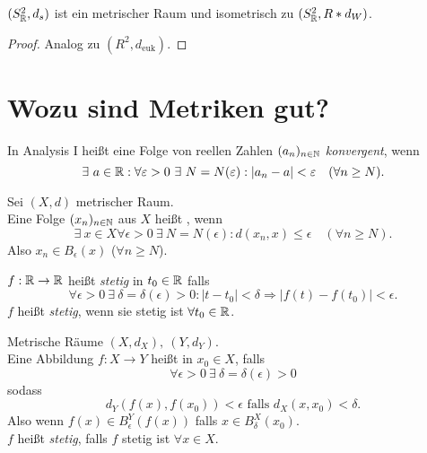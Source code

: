 \begin{theorem}
  $ (S^2_{\mathbb{R}}, d_s) $ ist ein metrischer Raum und isometrisch zu $ (S^2_{\mathbb{R}}, R*d_W) $.
  \begin{proof}
    Analog zu $ (R^2, d_\text{euk}) $.
  \end{proof}
\end{theorem}

\section{Wozu sind Metriken gut?}

\begin{remark}
  In Analysis I heißt eine Folge von reellen Zahlen $ (a_n)_{n \in \mathbb{N}} $ \emph{konvergent}, wenn
  \begin{equation*}
    \exists \ a \in \mathbb{R} : \forall \varepsilon > 0 \ \exists \ N = N(\varepsilon) : \vert a_n - a \vert < \varepsilon \quad (\forall n \geq N)\text{.}
  \end{equation*}
\end{remark}

\begin{remark}
  Sei $ (X, d) $ metrischer Raum. \\
  Eine Folge $ (x_n)_{n \in \mathbb{N}} $ aus $ X $ heißt , wenn
  \begin{equation*}
    \exists \ x \in X \forall \epsilon > 0 \ \exists \ N = N(\epsilon) : d(x_n, x) \leq \epsilon \quad (\forall n \geq N)\text{.}
  \end{equation*}
  Also $ x_n \in B_\epsilon(x) $ ($ \forall n \geq N $).
\end{remark}

\begin{remark}
  $ f: \mathbb{R} \to \mathbb{R} $ heißt \emph{stetig} in $ t_0 \in \mathbb{R} $ falls
  \begin{equation*}
    \forall \epsilon > 0 \ \exists \ \delta = \delta(\epsilon) > 0 : \vert t - t_0 \vert < \delta \Rightarrow \vert f(t)-f(t_0) \vert < \epsilon\text{.}
  \end{equation*}
  $ f $ heißt \emph{stetig}, wenn sie stetig ist $ \forall t_0 \in \mathbb{R} $.
\end{remark}

\begin{remark}
  Metrische Räume $ (X, d_X), \ (Y, d_Y) $. \\
  Eine Abbildung $ f: X \to Y $ heißt  in $ x_0 \in X $, falls
  \begin{equation*}
    \forall \epsilon > 0 \ \exists \ \delta = \delta(\epsilon) > 0
  \end{equation*}
  sodass
  \begin{equation*}
    d_Y(f(x), f(x_0)) < \epsilon \text{ falls } d_X(x, x_0) < \delta\text{.}
  \end{equation*}
  Also wenn $ f(x) \in B_\epsilon^Y(f(x)) $ falls $ x \in B_\delta^X(x_0) $. \\
  $ f $ heißt \emph{stetig}, falls $ f $ stetig ist $ \forall x \in X $.
\end{remark}

